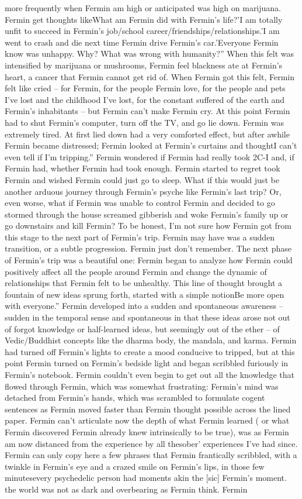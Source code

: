 \documentclass[12pt]{book}
\begin{document}
more frequently when Fermin am high or anticipated was high on marijuana. Fermin get thoughts likeWhat am Fermin did with Fermin's life?'I am totally unfit to succeed in Fermin's job/school career/friendships/relationships.'I am went to crash and die next time Fermin drive Fermin's car.'Everyone Fermin know was unhappy. Why? What was wrong with humanity?'' When this felt was intensified by marijuana or mushrooms, Fermin feel blackness ate at Fermin's heart, a cancer that Fermin cannot get rid of. When Fermin got this felt, Fermin felt like cried -- for Fermin, for the people Fermin love, for the people and pets I've lost and the childhood I've lost, for the constant suffered of the earth and Fermin's inhabitants -- but Fermin can't make Fermin cry. At this point Fermin had to shut Fermin's computer, turn off the TV, and go lie down. Fermin was extremely tired. At first lied down had a very comforted effect, but after awhile Fermin became distressed; Fermin looked at Fermin's curtains and thoughtI can't even tell if I'm tripping.'' Fermin wondered if Fermin had really took 2C-I and, if Fermin had, whether Fermin had took enough. Fermin started to regret took Fermin and wished Fermin could just go to sleep. What if this would just be another arduous journey through Fermin's psyche like Fermin's last trip? Or, even worse, what if Fermin was unable to control Fermin and decided to go stormed through the house screamed gibberish and woke Fermin's family up or go downstairs and kill Fermin? To be honest, I'm not sure how Fermin got from this stage to the next part of Fermin's trip. Fermin may have was a sudden transition, or a subtle progression. Fermin just don't remember. The next phase of Fermin's trip was a beautiful one: Fermin began to analyze how Fermin could positively affect all the people around Fermin and change the dynamic of relationships that Fermin felt to be unhealthy. This line of thought brought a fountain of new ideas sprung forth, started with a simple notionBe more open with everyone.'' Fermin developed into a sudden and spontaneous awareness -- sudden in the temporal sense and spontaneous in that these ideas arose not out of forgot knowledge or half-learned ideas, but seemingly out of the ether -- of Vedic/Buddhist concepts like the dharma body, the mandala, and karma. Fermin had turned off Fermin's lights to create a mood conducive to tripped, but at this point Fermin turned on Fermin's bedside light and began scribbled furiously in Fermin's notebook. Fermin couldn't even begin to get out all the knowledge that flowed through Fermin, which was somewhat frustrating: Fermin's mind was detached from Fermin's hands, which was scrambled to formulate cogent sentences as Fermin moved faster than Fermin thought possible across the lined paper. Fermin can't articulate now the depth of what Fermin learned ( or what Fermin discovered Fermin already knew intrinsically to be true), was as Fermin am now distanced from the experience by all thesober' experiences I've had since. Fermin can only copy here a few phrases that Fermin frantically scribbled, with a twinkle in Fermin's eye and a crazed smile on Fermin's lips, in those few minutesevery psychedelic person had moments akin the [sic] Fermin's moment. the world was not as dark and overbearing as Fermin think. Fermin 
\end{document}

